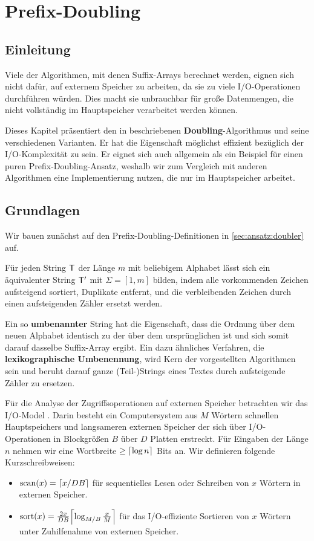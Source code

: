 \section{Prefix-Doubling}
\label{chapter:saca:doubling}

\subsection{Einleitung}

Viele  der Algorithmen, mit denen Suffix-Arrays berechnet werden, eignen sich nicht dafür, auf externem Speicher zu arbeiten, da sie zu viele I/O-Operationen durchführen würden. Dies macht sie unbrauchbar für große Datenmengen, die nicht vollständig im Hauptspeicher verarbeitet werden können.

Dieses Kapitel präsentiert den in \cite{saca:11} beschriebenen \textbf{Doubling}-Algorithmus und seine verschiedenen Varianten. Er hat die Eigenschaft möglichst effizient bezüglich der I/O-Komplexität zu sein. Er eignet sich auch allgemein als ein Beispiel für einen puren Prefix-Doubling-Ansatz, weshalb wir zum Vergleich mit anderen Algorithmen eine Implementierung nutzen, die nur im Hauptspeicher arbeitet.

\subsection{Grundlagen}

Wir bauen zunächst auf den Prefix-Doubling-Definitionen in \cref{sec:ansatz:doubler} auf. 

Für jeden String $\inputtext$ der Länge $m$ mit beliebigem Alphabet lässt sich ein äquivalenter String $\inputtext'$ mit $\Sigma = [1, m]$ bilden, indem alle vorkommenden Zeichen aufsteigend sortiert, Duplikate entfernt, und die verbleibenden Zeichen durch einen aufsteigenden Zähler ersetzt werden. 

Ein so \textbf{umbenannter} String hat die Eigenschaft, dass die Ordnung über dem neuen Alphabet identisch zu der über dem ursprünglichen ist und sich somit darauf dasselbe Suffix-Array ergibt. Ein dazu ähnliches Verfahren, die \textbf{lexikographische Umbenennung}, wird Kern der vorgestellten Algorithmen sein und beruht darauf ganze (Teil-)Strings eines Textes durch aufsteigende Zähler zu ersetzen.

Für die Analyse der Zugriffsoperationen auf externen Speicher betrachten wir das I/O-Model \cite{Vitter1994}. Darin besteht ein Computersystem aus $M$ Wörtern schnellen Hauptspeichers und langsameren externen Speicher der sich über I/O-Operationen in Blockgrößen $B$ über $D$ Platten erstreckt. Für Eingaben der Länge $n$ nehmen wir eine Wortbreite $\geq \ceil*{\log n}$ Bits an. Wir definieren folgende Kurzschreibweisen:
\begin{itemize}
\item $\text{scan}(x) = \ceil*{x/DB}$ für sequentielles Lesen oder Schreiben von $x$ Wörtern in externen Speicher.
\item $\text{sort}(x) = \frac{2x}{DB}\ceil*{\log_{M/B}\frac{x}{M}}$ für das I/O-effiziente Sortieren von $x$ Wörtern unter Zuhilfenahme von externen Speicher.
\end{itemize}

